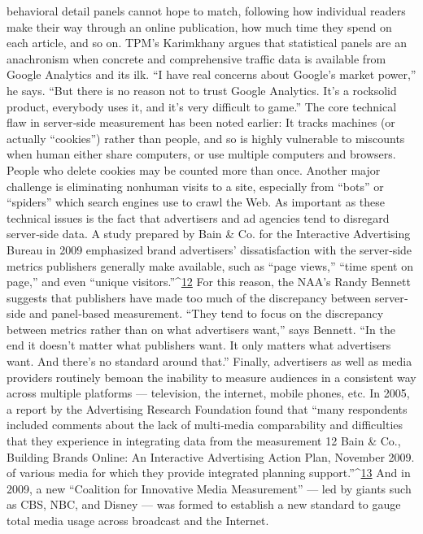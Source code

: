 behavioral detail panels cannot hope to match, following how individual
readers make their way through an online publication, how much time
they spend on each article, and so on.
TPM’s Karimkhany argues that statistical panels are an anachronism
when concrete and comprehensive traffic data is available from Google
Analytics and its ilk. ``I have real concerns about Google’s market power,''
he says. ``But there is no reason not to trust Google Analytics. It’s a rocksolid
product, everybody uses it, and it’s very difficult to game.''
The core technical flaw in server‐side measurement has been noted earlier:
It tracks machines (or actually ``cookies'') rather than people, and so is
highly vulnerable to miscounts when human either share computers, or
use multiple computers and browsers. People who delete cookies may be
counted more than once. Another major challenge is eliminating nonhuman
visits to a site, especially from ``bots'' or ``spiders'' which search
engines use to crawl the Web.
As important as these technical issues is the fact that advertisers and ad
agencies tend to disregard server‐side data. A study prepared by Bain &
Co. for the Interactive Advertising Bureau in 2009 emphasized brand
advertisers’ dissatisfaction with the server‐side metrics publishers
generally make available, such as ``page views,'' ``time spent on page,''
and even ``unique visitors.''^{\href{#endnotes}{12}}
For this reason, the NAA’s Randy Bennett suggests that publishers have
made too much of the discrepancy between server‐side and panel‐based
measurement. ``They tend to focus on the discrepancy between metrics
rather than on what advertisers want,'' says Bennett. ``In the end it doesn’t
matter what publishers want. It only matters what advertisers want. And
there’s no standard around that.''
Finally, advertisers as well as media providers routinely bemoan the
inability to measure audiences in a consistent way across multiple
platforms — television, the internet, mobile phones, etc. In 2005, a report
by the Advertising Research Foundation found that ``many respondents
included comments about the lack of multi‐media comparability and
difficulties that they experience in integrating data from the measurement
12 Bain & Co., Building Brands Online: An Interactive Advertising Action Plan,
November 2009.
of various media for which they provide integrated planning support.''^{\href{#endnotes}{13}}
And in 2009, a new ``Coalition for Innovative Media Measurement'' — led
by giants such as CBS, NBC, and Disney — was formed to establish a new
standard to gauge total media usage across broadcast and the Internet.
